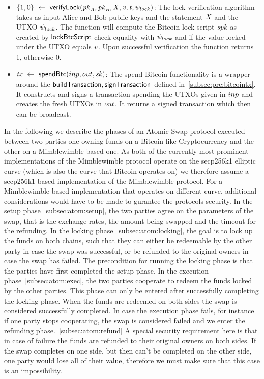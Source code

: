 \begin{itemize}
    \item $\{ 1,0 \} ~\leftarrow~ \mathsf{verifyLock} (\mathit{pk}_{\mathit{A}},\mathit{pk}_{\mathit{B}},\mathit{X},\mathit{v},\mathit{t},\psi_{lock})$:
    The lock verification algorithm takes as input Alice and Bob public keys and the statement $\mathit{X}$ and the UTXO $\psi_{lock}$.
    The function will compute the Bitcoin lock script $\mathit{spk}$ as created by $\mathsf{lockBtcScript}$ check equality with $\psi_{lock}$ and if the value locked under the UTXO equals $\mathit{v}$.
    Upon successful verification the function returns 1, otherwise 0.
    \item $\mathit{tx} ~\leftarrow~ \mathsf{spendBtc}(inp,out,\mathit{sk})$:
    The spend Bitcoin functionality is a wrapper around the $\mathsf{buildTransaction}, \mathsf{signTransaction}$ defined in~\cref{subsec:pre:bitcointx}.
    It constructs and signs a transaction spending the UTXOs given in $inp$ and creates the fresh UTXOs in $out$.
    It returns a signed transaction which then can be broadcast.
\end{itemize}


In the following we describe the phases of an Atomic Swap protocol executed between two parties one owning funds on a Bitcoin-like Cryptocurrency and the other on a Mimblewimble-based one.
As both of the currently most prominent implementations of the Mimblewimble protocol operate on the secp256k1 elliptic curve (which is also the curve that Bitcoin operates on) we therefore assume a secp256k1-based implementation of the Mimblewimble protocol.
For a Mimblewimble-based implementation that operates on different curve, additional considerations would have to be made to gurantee the protocols security.
In the setup phase~\cref{subsec:atom:setup}, the two parties agree on the parameters of the swap, that is the exchange rates, the amount being swapped and the timeout for the refunding.
In the locking phase~\cref{subsec:atom:locking}, the goal is to lock up the funds on both chains, such that they can either be redeemable by the other party in case the swap was successful, or be refunded to the original owners in case the swap has failed.
The precondition for running the locking phase is that the parties have first completed the setup phase.
In the execution phase~\cref{subsec:atom:exec}, the two parties cooperate to redeem the funds locked by the other parties.
This phase can only be entered after successfully completing the locking phase.
When the funds are redeemed on both sides the swap is considered successfully completed.
In case the execution phase fails, for instance if one party stops cooperating, the swap is considered failed and we enter the refunding phase.~\cref{subsec:atom:refund}
A special security requirement here is that in case of failure the funds are refunded to their original owners on both sides.
If the swap completes on one side, but then can't be completed on the other side, one party would lose all of their value, therefore we must make sure that this case is an impossibility.

